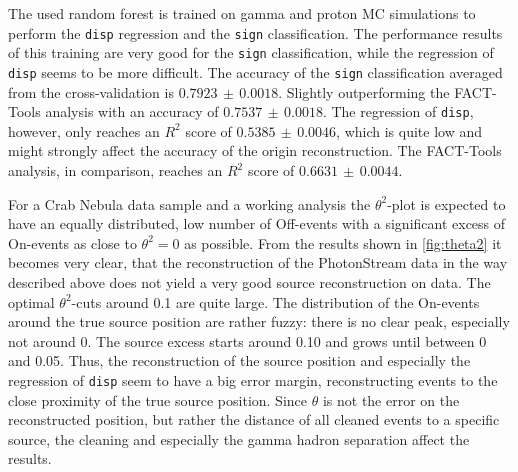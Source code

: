 The used random forest is trained on gamma and proton MC simulations to perform
the \texttt{disp} regression and the \texttt{sign} classification. The
performance results of this training are very good for the \texttt{sign}
classification, while the regression of \texttt{disp} seems to be more
difficult. The accuracy of the \texttt{sign} classification averaged from the
cross-validation is $0.7923\,\pm\,0.0018$. Slightly outperforming the FACT-
Tools analysis with an accuracy of $0.7537\,\pm\,0.0018$. The regression of
\texttt{disp}, however, only reaches an $R^2$ score of $0.5385\,\pm\,0.0046$,
which is quite low and might strongly affect the accuracy of the origin reconstruction. The FACT-Tools analysis, in comparison, reaches an $R^2$ score of $0.6631\,\pm\,0.0044$.

For a Crab Nebula data sample and a working analysis the $\theta^2$-plot is
expected to have an equally distributed, low number of Off-events with a
significant excess of On-events as close to $\theta^2 = 0$ as possible. From
the results shown in \autoref{fig:theta2} it becomes very clear, that the
reconstruction of the PhotonStream data in the way described above does not
yield a very good source reconstruction on data. The optimal $\theta^2$-cuts
around \num{0.1} are quite large. The distribution of the On-events around the
true source position are rather fuzzy: there is no clear peak, especially not
around \num{0}. The source excess starts around \num{0.10} and grows until
between \num{0} and \num{0.05}. Thus, the reconstruction of the source position
and especially the regression of \texttt{disp} seem to have a big error margin,
reconstructing events to the close proximity of the true source position. Since
$\theta$ is not the error on the reconstructed position, but rather the
distance of all cleaned events to a specific source, the cleaning and
especially the gamma hadron separation affect the results.
%
